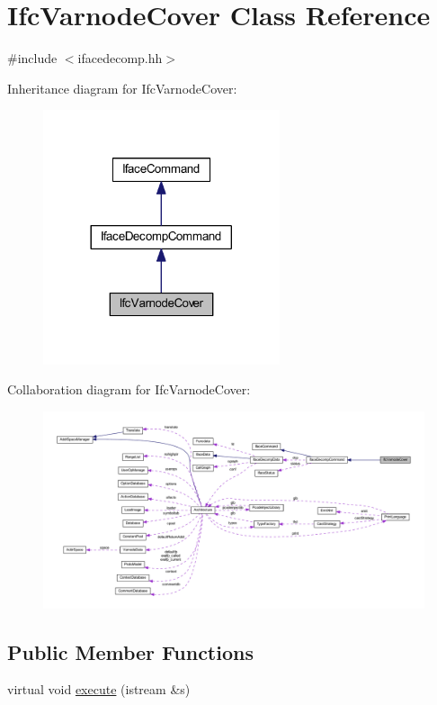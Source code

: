\hypertarget{class_ifc_varnode_cover}{}\section{Ifc\+Varnode\+Cover Class Reference}
\label{class_ifc_varnode_cover}


{\ttfamily \#include $<$ifacedecomp.\+hh$>$}



Inheritance diagram for Ifc\+Varnode\+Cover\+:
\nopagebreak
\begin{figure}[H]
\begin{center}
\leavevmode
\includegraphics[width=197pt]{class_ifc_varnode_cover__inherit__graph}
\end{center}
\end{figure}


Collaboration diagram for Ifc\+Varnode\+Cover\+:
\nopagebreak
\begin{figure}[H]
\begin{center}
\leavevmode
\includegraphics[width=350pt]{class_ifc_varnode_cover__coll__graph}
\end{center}
\end{figure}
\subsection*{Public Member Functions}
\begin{DoxyCompactItemize}
\item 
virtual void \mbox{\hyperlink{class_ifc_varnode_cover_aff6014b51215552ea689e3cde90b7e6c}{execute}} (istream \&s)
\end{DoxyCompactItemize}
